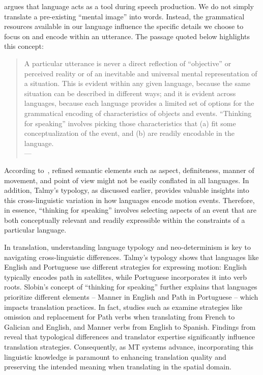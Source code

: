 {{\textcite{slobin1987thinking} argues that language acts as a tool during speech production. We do not simply translate a pre-existing ``mental image'' into words. Instead, the grammatical resources available in our language influence the specific details we choose to focus on and encode within an utterance. The passage quoted below highlights this concept:

\begin{quote}
A particular utterance is never a direct reflection of ``objective'' or perceived reality or of an inevitable and universal mental representation of a situation. This is evident within any given language, because the same situation can be described in different ways; and it is evident across languages, because each language provides a limited set of options for the grammatical encoding of characteristics of objects and events. ``Thinking for speaking'' involves picking those characteristics that (a) fit some conceptualization of the event, and (b) are readily encodable in the language. \\
\phantom{abc}
\hfill --- \textcite[435]{slobin1987thinking}
\end{quote}

According to~\textcite{slobin1987thinking}, refined semantic elements such as aspect, definiteness, manner of movement, and point of view might not be easily conflated in all languages. In addition, Talmy's typology, as discussed earlier, provides valuable insights into this cross-linguistic variation in how languages encode motion events. Therefore, in essence, ``thinking for speaking'' involves selecting aspects of an event that are both conceptually relevant and readily expressible within the constraints of a particular language.

In translation, understanding language typology and neo-determinism is key to navigating cross-linguistic differences. Talmy’s typology shows that languages like English and Portuguese use different strategies for expressing motion: English typically encodes path in satellites, while Portuguese incorporates it into verb roots. Slobin's concept of ``thinking for speaking'' further explains that languages prioritize different elements -- Manner in English and Path in Portuguese -- which impacts translation practices. In fact, studies such as \textcite{cifuentes-ferez2015thinking, alonso2022} examine strategies like omission and replacement for Path verbs when translating from French to Galician and English, and Manner verbs from English to Spanish. Findings from \textcite{cifuentes-ferez2015thinking} reveal that typological differences and translator expertise significantly influence translation strategies. Consequently, as MT systems advance, incorporating this linguistic knowledge is paramount to enhancing translation quality and preserving the intended meaning when translating in the spatial domain.


}}
